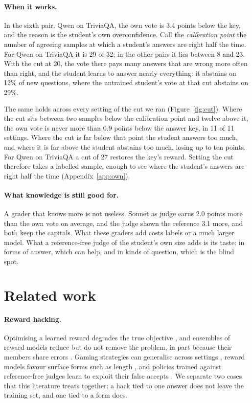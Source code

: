\documentclass[11pt,a4paper,twocolumn]{article}
\begin{document}
\paragraph{When it works.} In the sixth pair, Qwen on TriviaQA, the own vote is 3.4 points below the key, and the reason is the student's own overconfidence. Call the \emph{calibration point} the number of agreeing samples at which a student's answers are right half the time. For Qwen on TriviaQA it is 29 of 32; in the other pairs it lies between 8 and 23. With the cut at 20, the vote there pays many answers that are wrong more often than right, and the student learns to answer nearly everything: it abstains on 12\% of new questions, where the untrained student's vote at that cut abstains on 29\%.

The same holds across every setting of the cut we ran (Figure~\ref{fig:cut}). Where the cut sits between two samples below the calibration point and twelve above it, the own vote is never more than 0.9 points below the answer key, in 11 of 11 settings. Where the cut is far below that point the student answers too much, and where it is far above the student abstains too much, losing up to ten points. For Qwen on TriviaQA a cut of 27 restores the key's reward. Setting the cut therefore takes a labelled sample, enough to see where the student's answers are right half the time (Appendix~\ref{app:own}).

\paragraph{What knowledge is still good for.} A grader that knows more is not useless. Sonnet as judge earns 2.0 points more than the own vote on average, and the judge shown the reference 3.1 more, and both keep the capitals. What these graders add costs labels or a much larger model. What a reference-free judge of the student's own size adds is its taste: in forms of answer, which can help, and in kinds of question, which is the blind spot.

\section{Related work}

\paragraph{Reward hacking.} Optimising a learned reward degrades the true objective \citep{skalse2022,gao2023}, and ensembles of reward models reduce but do not remove the problem, in part because their members share errors \citep{coste2024,eisenstein2023}. Gaming strategies can generalise across settings \citep{denison2024,macdiarmid2025}, reward models favour surface forms such as length \citep{singhal2023}, and policies trained against reference-free judges learn to exploit their false accepts \citep{zhou2026,wang2026pace}. We separate two cases that this literature treats together: a hack tied to one answer does not leave the training set, and one tied to a form does.
\end{document}
